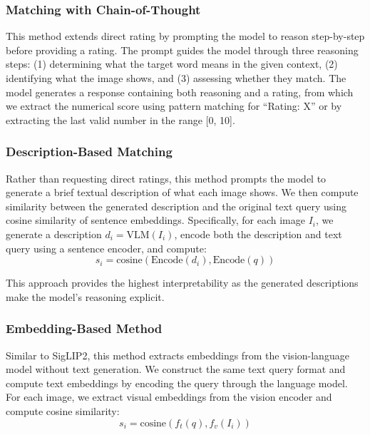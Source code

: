 \documentclass[11pt]{article}
\begin{document}
\subsubsection{Matching with Chain-of-Thought}
\label{subsubsec:matching_cot}

This method extends direct rating by prompting the model to reason step-by-step before providing a rating. The prompt guides the model through three reasoning steps: (1) determining what the target word means in the given context, (2) identifying what the image shows, and (3) assessing whether they match. The model generates a response containing both reasoning and a rating, from which we extract the numerical score using pattern matching for ``Rating: X'' or by extracting the last valid number in the range [0, 10].

\subsubsection{Description-Based Matching}
\label{subsubsec:description}

Rather than requesting direct ratings, this method prompts the model to generate a brief textual description of what each image shows. We then compute similarity between the generated description and the original text query using cosine similarity of sentence embeddings. Specifically, for each image $I_i$, we generate a description $d_i = \text{VLM}(I_i)$, encode both the description and text query using a sentence encoder, and compute:
\begin{equation}
s_i = \text{cosine}(\text{Encode}(d_i), \text{Encode}(q))
\end{equation}

This approach provides the highest interpretability as the generated descriptions make the model's reasoning explicit.

\subsubsection{Embedding-Based Method}
\label{subsubsec:vlm_embedding}

Similar to SigLIP2, this method extracts embeddings from the vision-language model without text generation. We construct the same text query format and compute text embeddings by encoding the query through the language model. For each image, we extract visual embeddings from the vision encoder and compute cosine similarity:
\begin{equation}
s_i = \text{cosine}(f_t(q), f_v(I_i))
\end{equation}
\end{document}
